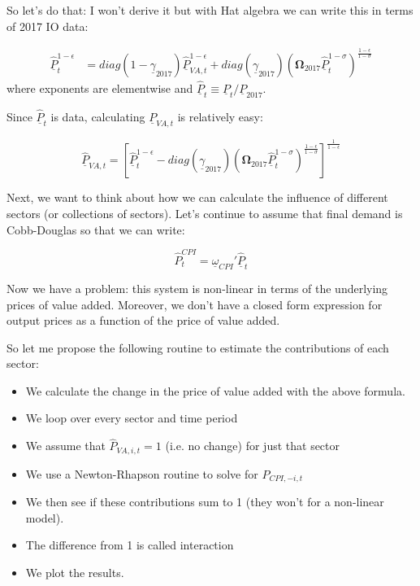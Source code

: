 \documentclass[12pt,english]{article}
\begin{document}
So let's do that: I won't derive it but with Hat algebra we can write this in terms of 2017 IO data:

\begin{align*}
	\hat{\underline{P}}_t^{1-\epsilon} &= diag(1-\underline{\gamma}_{2017})\hat{\underline{P}}_{VA,t}^{1-\epsilon} + diag(\underline{\gamma}_{2017}) \left(\mathbf{\Omega}_{2017}\hat{\underline{P}}_{t}^{1-\sigma} \right)^{\frac{1-\epsilon}{1-\sigma}}
\end{align*}
where exponents are elementwise and $\hat{\underline{P}}_t \equiv \underline{P}_{t}/\underline{P}_{2017}$.

Since $\hat{\underline{P}}_t$ is data, calculating $\underline{P}_{VA,t}$ is relatively easy:

\[
	\hat{\underline{P}}_{VA,t} = \left[\hat{\underline{P}}_t^{1-\epsilon} -diag(\underline{\gamma}_{2017}) \left(\mathbf{\Omega}_{2017}\hat{\underline{P}}_{t}^{1-\sigma} \right)^{\frac{1-\epsilon}{1-\sigma}}\right]^{\frac{1}{1-\epsilon}}
\]

Next, we want to think about how we can calculate the influence of different sectors (or collections of sectors). Let's continue to assume that final demand is Cobb-Douglas so that we can write:

\[
	\hat{P}_t^{CPI} = \underline{\omega}_{CPI}' \hat{\underline{P}}_t 
\]

Now we have a problem: this system is non-linear in terms of the underlying prices of value added. Moreover, we don't have a closed form expression for output prices as a function of the price of value added. 

So let me propose the following routine to estimate the contributions of each sector:

\begin{itemize}
	\item We calculate the change in the price of value added with the above formula.
	\item We loop over every sector and time period
	\item We assume that $\hat{P}_{VA,i,t}=1$ (i.e. no change) for just that sector
	\item We use a Newton-Rhapson routine to solve for $P_{CPI,-i,t}$
	\item We then see if these contributions sum to 1 (they won't for a non-linear model). 
	\item The difference from 1 is called interaction
	\item We plot the results.
\end{itemize}
\end{document}
